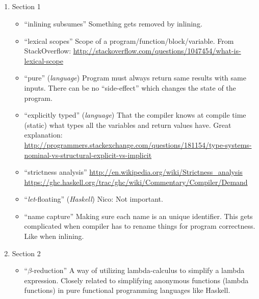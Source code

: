 

\subsection{\cite{GHC-paper}}
\begin{enumerate}

	\item Section 1
\begin{itemize}

	\item ``inlining subsumes''
Something gets removed by inlining.

	\item ``lexical scopes''
Scope of a program/function/block/variable.
From StackOverflow:
\url{http://stackoverflow.com/questions/1047454/what-is-lexical-scope}

	\item ``pure'' (\textit{language})
Program must always return same results with same inputs. There can be no
``side-effect'' which changes the state of the program.

	\item ``explicitly typed'' (\textit{language})
That the compiler knows at compile time (static) what types all the variables
and return values have.
Great explanation: \url{http://programmers.stackexchange.com/questions/181154/type-systems-nominal-vs-structural-explicit-vs-implicit}

	\item ``strictness analysis''
\url{http://en.wikipedia.org/wiki/Strictness_analysis}
\url{https://ghc.haskell.org/trac/ghc/wiki/Commentary/Compiler/Demand}

	\item ``\textit{let}-floating'' (\textit{Haskell})
Nico: Not important.

	\item ``name capture''
Making sure each name is an unique identifier. This gets complicated when
compiler has to rename things for program correctness. Like when inlining.

\end{itemize}

	\item Section 2
\begin{itemize}

	\item ``\textit{$\beta$}-reduction''
A way of utilizing lambda-calculus to simplify a lambda expression. Closely related to simplifying anonymous functions (lambda functions) in pure functional programming languages like Haskell.


\end{itemize}
\end{enumerate}
